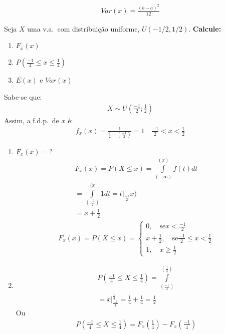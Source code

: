 \begin{description}
\begin{example}
\begin{align*}
    Var(x) = \frac{ \left(b-a\right)^2 }{12}
  \end{align*}
\end{example}
\begin{example}Seja $X$ uma v.a.\ com distribuição uniforme, $U(-1/2 , 1/2).$
  \textbf{Calcule:}
  \begin{enumerate}[label=(\alph*)]
    \item $F_{x} (x)$
    \item $P(\frac{-1}{4} \leq x \leq \frac{1}{4})$
    \item $E(x)$ e $Var(x)$
  \end{enumerate}
  Sabe-se que:
  \begin{align*}
    X \sim  U(\frac{-1}{2}; \frac{1}{2})
  \end{align*}
  Assim, a f.d.p.\ de $x$ é:
  \begin{align*}
    f_{x} (x)= \frac{1}{\frac{1}{2}- \left( \frac{-1}{2}\right)} = 1 \quad \frac{-1}{2}<x<\frac{1}{2}
  \end{align*}
  \begin{enumerate}[label=(\alph*)]
    \item  $F_{x}(x)=?$
      \begin{align*}
        F_{x} (x)= P(X \leq x) = \int \limits_{( -\infty  )}^{(x)} f(t)dt\\
        = \int \limits_{(\frac{-1}{2})}^{(x} 1 dt= t|_{\frac{-1}{2}}{x)} \\
        = x+ \frac{1}{2}
      \end{align*}
      \begin{align*}
        F_{x} (x) = P(X \leq x) = \begin{cases}
          0, \quad \text{se}  x< \frac{-1}{2} \\
          x+ \frac{1}{2} , \quad \text{se} \frac{-1}{2} \leq x < \frac{1}{2} \\
          1, \quad x \ge \frac{1}{2}
        \end{cases}
      \end{align*}
    \item 
      \begin{align*}
        P(\frac{-1}{4}\leq X \leq \frac{1}{4})  = \int \limits_{(\frac{-1}{4})}^{(\frac{1}{4})}\\
        = x|_{\frac{-1}{4}}^{\frac{1}{4}}= \frac{1}{4}+\frac{1}{4}=\frac{1}{2}
      \end{align*}
      Ou 
      \begin{align*}
        P(\frac{-1}{4} \leq X \leq \frac{1}{4})= F_{x}(\frac{1}{4})-F_{x}(\frac{-1}{4}) \\

\end{align*}
\end{enumerate}
\end{example}
\end{description}
